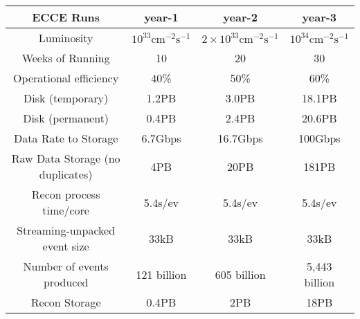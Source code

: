 \begin{table*}[ht]
    \centering
    \begin{tabular}{c|c|c|c}
        \hline
         \textbf{ECCE Runs}       & year-1                & year-2                  & year-3                \\
        \hline
         Luminosity              & $10^{33}\mathrm{cm}^{-2}\mathrm{s}^{-1}$ & $2\times 10^{33}\mathrm{cm}^{-2}\mathrm{s}^{-1}$ & $10^{34}\mathrm{cm}^{-2}\mathrm{s}^{-1}$ \\
         Weeks of Running        & 10                    & 20                      & 30                    \\
         Operational efficiency    & 40\%                  & 50\%                    & 60\%                  \\
        Disk (temporary)  &  1.2PB & 3.0PB & 18.1PB \\
        Disk (permanent)    & 0.4PB & 2.4PB &	20.6PB \\
         Data Rate to Storage    & 6.7Gbps               & 16.7Gbps                & 100Gbps               \\
         Raw Data Storage (no duplicates) & 4PB          & 20PB                    & 181PB                 \\
        \hline
        Recon process time/core	& 5.4s/ev	& 5.4s/ev	& 5.4s/ev \\
        Streaming-unpacked event size	& 33kB	& 33kB & 33kB \\
        Number of events produced &	121 billion	& 605 billion & 5,443 billion \\
         Recon Storage          & 0.4PB                  & 2PB                    & 18PB                   \\

\end{tabular}
\end{table*}
